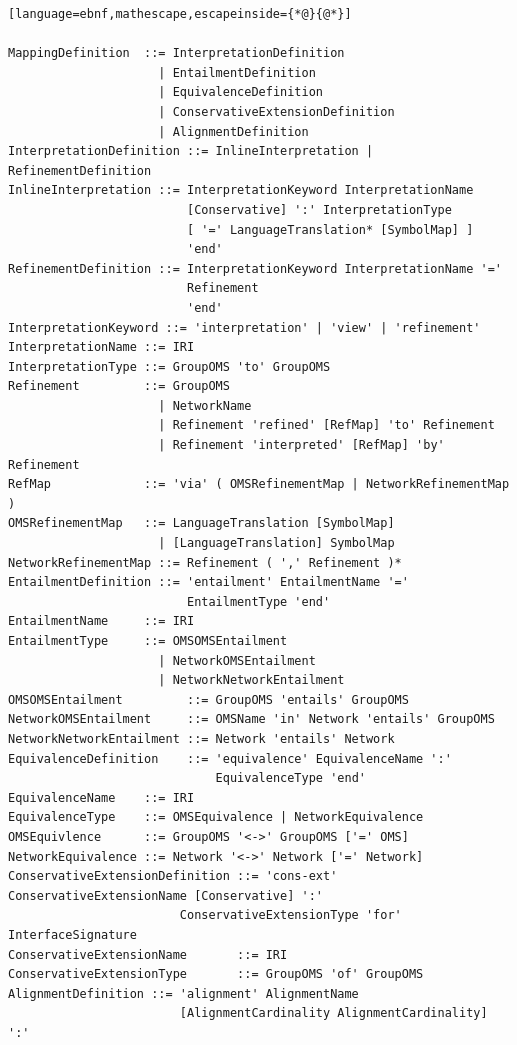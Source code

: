 \documentclass[10pt, a4paper]{isov2}
\begin{document}
\vspace{-2em}
\begin{lstlisting}[language=ebnf,mathescape,escapeinside={*@}{@*}]

MappingDefinition  ::= InterpretationDefinition
                     | EntailmentDefinition
                     | EquivalenceDefinition
                     | ConservativeExtensionDefinition
                     | AlignmentDefinition
InterpretationDefinition ::= InlineInterpretation | RefinementDefinition
InlineInterpretation ::= InterpretationKeyword InterpretationName
                         [Conservative] ':' InterpretationType
                         [ '=' LanguageTranslation* [SymbolMap] ]
                         'end'
RefinementDefinition ::= InterpretationKeyword InterpretationName '='
                         Refinement
                         'end'
InterpretationKeyword ::= 'interpretation' | 'view' | 'refinement'
InterpretationName ::= IRI
InterpretationType ::= GroupOMS 'to' GroupOMS
Refinement         ::= GroupOMS
                     | NetworkName
                     | Refinement 'refined' [RefMap] 'to' Refinement
                     | Refinement 'interpreted' [RefMap] 'by' Refinement
RefMap             ::= 'via' ( OMSRefinementMap | NetworkRefinementMap )
OMSRefinementMap   ::= LanguageTranslation [SymbolMap]
                     | [LanguageTranslation] SymbolMap
NetworkRefinementMap ::= Refinement ( ',' Refinement )*
EntailmentDefinition ::= 'entailment' EntailmentName '='
                         EntailmentType 'end'
EntailmentName     ::= IRI
EntailmentType     ::= OMSOMSEntailment
                     | NetworkOMSEntailment
                     | NetworkNetworkEntailment
OMSOMSEntailment         ::= GroupOMS 'entails' GroupOMS
NetworkOMSEntailment     ::= OMSName 'in' Network 'entails' GroupOMS
NetworkNetworkEntailment ::= Network 'entails' Network
EquivalenceDefinition    ::= 'equivalence' EquivalenceName ':'
                             EquivalenceType 'end'
EquivalenceName    ::= IRI
EquivalenceType    ::= OMSEquivalence | NetworkEquivalence
OMSEquivlence      ::= GroupOMS '<->' GroupOMS ['=' OMS]
NetworkEquivalence ::= Network '<->' Network ['=' Network]
ConservativeExtensionDefinition ::= 'cons-ext' ConservativeExtensionName [Conservative] ':'
                        ConservativeExtensionType 'for' InterfaceSignature
ConservativeExtensionName       ::= IRI
ConservativeExtensionType       ::= GroupOMS 'of' GroupOMS
AlignmentDefinition ::= 'alignment' AlignmentName
                        [AlignmentCardinality AlignmentCardinality] ':'

\end{lstlisting}
\end{document}
